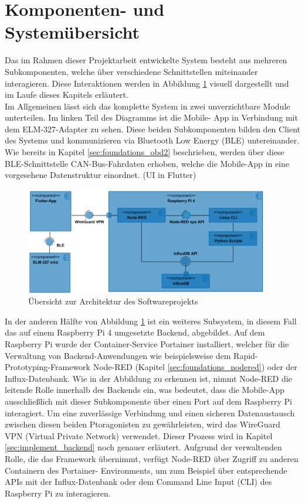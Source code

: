 \documentclass[oneside]{ausarbeitung}
\begin{document}
\newpage
\section{Komponenten- und Systemübersicht}
\label{sec:implement_components}

Das im Rahmen dieser Projektarbeit entwickelte System besteht aus mehreren Subkomponenten, welche über verschiedene Schnittstellen 
miteinander interagieren. Diese Interaktionen werden in Abbildung {\ref{fig:architecture}} visuell dargestellt und im Laufe dieses 
Kapitels erläutert. 
\\
Im Allgemeinen lässt sich das komplette System in zwei unverzichtbare Module unterteilen. Im linken Teil des Diagramms ist die Mobile-
App in Verbindung mit dem ELM-327-Adapter zu sehen. Diese beiden Subkomponenten bilden den Client des Systems und kommunizieren via 
Bluetooth Low Energy (BLE) untereinander.
Wie bereits in Kapitel {\ref{sec:foundations_obd2}} beschrieben, werden über diese BLE-Schnittstelle CAN-Bus-Fahrdaten erhoben, welche 
die Mobile-App in eine vorgesehene Datenstruktur einordnet.
(UI in Flutter)

\begin{figure}[h!]
  \centering
  \includegraphics[width=0.95\textwidth]{images/component_diagramm_overview.png}
  \caption{Übersicht zur Architektur des Softwareprojekts}
  \label{fig:architecture}
\end{figure}

In der anderen Hälfte von Abbildung {\ref{fig:architecture}} ist ein weiteres Subsystem, in diesem Fall das auf einem Raspberry Pi 4 
umgesetzte Backend, abgebildet. Auf dem Raspberry Pi wurde der Container-Service Portainer installiert, welcher für die Verwaltung von 
Backend-Anwendungen wie beispielsweise dem Rapid-Prototyping-Framework Node-RED (Kapitel \ref{sec:foundations_nodered}) oder der 
Influx-Datenbank.
Wie in der Abbildung zu erkennen ist, nimmt Node-RED die leitende Rolle innerhalb des Backends ein, was bedeutet, dass die Mobile-App 
ausschließlich mit dieser Subkomponente über einen Port auf dem Raspberry Pi interagiert. Um eine zuverlässige Verbindung und einen 
sicheren Datenaustausch zwischen diesen beiden Ptoragonisten zu gewährleisten,
wird das WireGuard VPN (Virtual Private Network) verwendet. Dieser Prozess wird in Kapitel \ref{sec:implement_backend} noch genauer erläutert.
Aufgrund der verwaltenden Rolle, die das Framework übernimmt, verfügt Node-RED über Zugriff zu anderen Containern des Portainer-
Environments, um zum Beispiel über entsprechende APIs mit der Influx-Datenbank oder dem Command Line Input (CLI) des Raspberry Pi 
zu interagieren.
\end{document}
